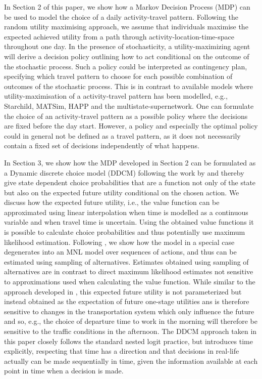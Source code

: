 In Section 2 of this paper, we show how a Markov Decision Process (MDP) can be used to model the choice of a daily activity-travel pattern. Following the random utility maximising approach, we assume that individuals maximise the expected achieved utility from a path through activity-location-time-space throughout one day. In the presence of stochasticity, a utility-maximizing agent will derive a decision policy outlining how to act conditional on the outcome of the stochastic process. Such a policy could be interpreted as contingency plan, specifying which travel pattern to choose for each possible combination of outcomes of the stochastic process. This is in contrast to available models where utility-maximisation of a activity-travel pattern has been modelled, e.g., Starchild, MATSim, HAPP and the multistate-supernetwork. One can formulate the choice of an activity-travel pattern as a possible policy where the decisions are fixed before the day start. However, a policy and especially the optimal policy could in general not be defined as a travel pattern, as it does not necessarily contain a fixed set of decisions independently of what happens. 


In Section 3, we show how the MDP developed in Section 2 can be formulated as a Dynamic discrete choice model (DDCM) following the work by \citet{rust1987} and thereby give state dependent choice probabilities that are a function not only of the state but also on the expected future utility conditional on the chosen action. We discuss how the expected future utility, i.e., the value function can be approximated using linear interpolation when time is modelled as a continuous variable and when travel time is uncertain. Using the obtained value functions it is possible to calculate choice probabilities and thus potentially use maximum likelihood estimation. Following \citet{fosgerau2013}, we show how the model in a special case degenerates into an MNL model over sequences of actions, and thus can be estimated using sampling of alternatives. Estimates obtained using sampling of alternatives are in contrast to direct maximum likelihood estimates not sensitive to approximations used when calculating the value function.
While similar to the approach developed in \citet{Habib11RUM}, this expected future utility is not parameterized but instead obtained as the expectation of  future one-stage utilities ans is therefore sensitive to changes in the transportation system which only influence the future and so, e.g., the choice of departure time to work in the morning will therefore be sensitive to the traffic conditions in the afternoon. The DDCM approach taken in this paper closely follows the standard nested logit practice, but introduces time explicitly, respecting that time has a direction and that decisions in real-life actually can be made sequentially in time, given the information available at each point in time when a decision is made. 

